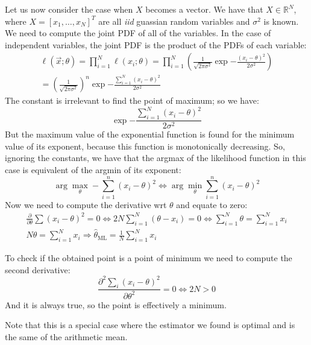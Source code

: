 Let us now consider the case when $X$ becomes a vector. We have that $X \in \mathbb{R}^N$, where
$X = \left[x_1, \dots, x_N\right]^T$ are all \textit{iid} guassian random variables and $\sigma^2$ is known. We need to compute the joint PDF of all of the variables. In the case of independent variables, the joint PDF is the product of the PDFs of each variable:
\begin{align*}
    \ell(\vec{x};\theta) = \prod_{i=1}^{N} \ell(x_i;\theta) = \prod_{i=1}^{N} \left(\frac{1}{\sqrt{2\pi\sigma^2}} \exp{-\frac{(x_i - \theta)^2}{2\sigma^2}}\right) \\
    = \left(\frac{1}{\sqrt{2\pi\sigma^2}}\right)^n \exp{-\frac{\sum_{i=1}^{N} (x_i - \theta)^2}{2\sigma^2}}
\end{align*}
The constant is irrelevant to find the point of maximum; so we have:
\[
    \exp{-\frac{\sum_{i=1}^{N} (x_i - \theta)^2}{2\sigma^2}}
\]
But the maximum value of the exponential function is found for the minimum value of its exponent, because this function is monotonically decreasing. So, ignoring the constants, we have that the argmax of the likelihood function in this case is equivalent of the argmin of its exponent:
\[
    \arg\max_{\theta} - \sum_{i = 1}^{n} {(x_i - \theta)^2} \Leftrightarrow \arg\min_{\theta} \sum_{i = 1}^{n} {(x_i - \theta)^2}
\]
Now we need to compute the derivative wrt $\theta$ and equate to zero:
\begin{gather*}
    \frac{\partial }{\partial \theta}\sum(x_i-\theta)^2 = 0 \Leftrightarrow 2N\sum_{i=1}^N(\theta - x_i) = 0 \Leftrightarrow \sum_{i=1}^N \theta = \sum_{i=1}^N x_i \\
    N\theta = \sum_{i=1}^N x_i \Rightarrow \hat{\theta}_{\text{ML}}  = \frac{1}{N}\sum_{i=1}^N x_i
\end{gather*}

To check if the obtained point is a point of minimum we need to compute the second derivative:
\[
    \frac{\partial^2 \sum_i(x_i-\theta)^2}{\partial \theta^2} = 0 \Leftrightarrow 2N > 0
\]
And it is always true, so the point is effectively a minimum.

Note that this is a special case where the estimator we found is optimal and is the same of the arithmetic mean.

